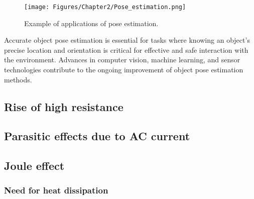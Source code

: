 \begin{figure}[th]
    \centering
    \texttt{[image: Figures/Chapter2/Pose\_estimation.png]}
    \caption[Example of applications of pose estimation.]{Example of applications of pose estimation.}
    \label{fig:PoseEstimation}
\end{figure}

Accurate object pose estimation is essential for tasks where knowing an object's precise location and orientation is critical for effective and safe interaction with the environment. Advances in computer vision, machine learning, and sensor technologies contribute to the ongoing improvement of object pose estimation methods.


\subsection{Rise of high resistance}

\subsection{Parasitic effects due to AC current}

\subsection{Joule effect}

\subsubsection{Need for heat dissipation}
